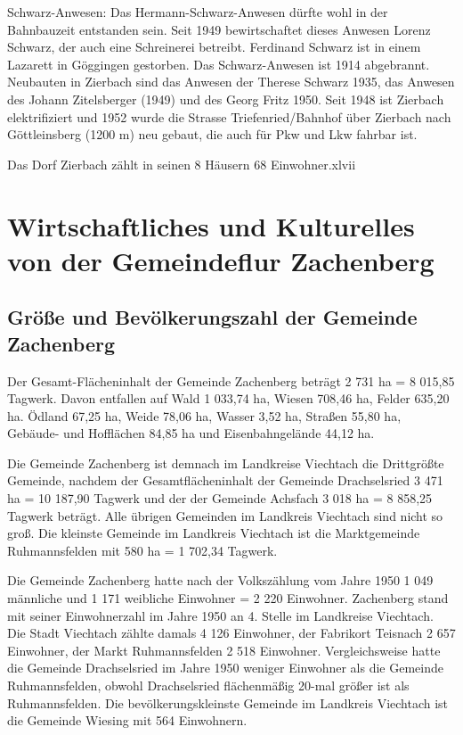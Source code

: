 \documentclass{book}
\begin{document}
Schwarz-Anwesen: Das Hermann-Schwarz-Anwesen dürfte wohl in der Bahnbauzeit
entstanden sein. Seit 1949 bewirtschaftet dieses Anwesen Lorenz Schwarz, der
auch eine Schreinerei betreibt. Ferdinand Schwarz ist in einem Lazarett in
Göggingen gestorben. Das Schwarz-Anwesen ist 1914 abgebrannt. Neubauten in
Zierbach sind das Anwesen der Therese Schwarz 1935, das Anwesen des Johann
Zitelsberger (1949) und des Georg Fritz 1950. Seit 1948 ist Zierbach
elektrifiziert und 1952 wurde die Strasse Triefenried/Bahnhof über Zierbach nach
Göttleinsberg (1200 m) neu gebaut, die auch für Pkw und Lkw fahrbar ist.

Das Dorf Zierbach zählt in seinen 8 Häusern 68 Einwohner.xlvii

\chapter{Wirtschaftliches und Kulturelles von der Gemeindeflur Zachenberg}

\section{Größe und Bevölkerungszahl der Gemeinde Zachenberg}

Der Gesamt-Flächeninhalt der Gemeinde Zachenberg beträgt 2 731 ha = 8 015,85
Tagwerk. Davon entfallen auf Wald 1 033,74 ha, Wiesen 708,46 ha, Felder 635,20
ha. Ödland 67,25 ha, Weide 78,06 ha, Wasser 3,52 ha, Straßen 55,80 ha, Gebäude-
und Hofflächen 84,85 ha und Eisenbahngelände 44,12 ha.

Die Gemeinde Zachenberg ist demnach im Landkreise Viechtach die Drittgrößte
Gemeinde, nachdem der Gesamtflächeninhalt der Gemeinde Drachselsried 3 471 ha =
10 187,90 Tagwerk und der der Gemeinde Achsfach 3 018 ha = 8 858,25 Tagwerk
beträgt. Alle übrigen Gemeinden im Landkreis Viechtach sind nicht so groß. Die
kleinste Gemeinde im Landkreis Viechtach ist die Marktgemeinde Ruhmannsfelden
mit 580 ha = 1 702,34 Tagwerk.

Die Gemeinde Zachenberg hatte nach der Volkszählung vom Jahre 1950 1 049
männliche und 1 171 weibliche Einwohner = 2 220 Einwohner. Zachenberg stand mit
seiner Einwohnerzahl im Jahre 1950 an 4. Stelle im Landkreise Viechtach. Die
Stadt Viechtach zählte damals 4 126 Einwohner, der Fabrikort Teisnach 2 657
Einwohner, der Markt Ruhmannsfelden 2 518 Einwohner. Vergleichsweise hatte die
Gemeinde Drachselsried im Jahre 1950 weniger Einwohner als die Gemeinde
Ruhmannsfelden, obwohl Drachselsried flächenmäßig 20-mal größer ist als
Ruhmannsfelden. Die bevölkerungskleinste Gemeinde im Landkreis Viechtach ist die
Gemeinde Wiesing mit 564 Einwohnern.
\end{document}
